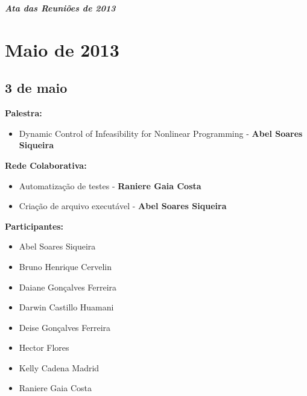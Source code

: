 \documentclass[12pt]{article}
\begin{document}
\centerline{
\textit{\Large\textbf{\emph{{Ata das Reuni\~oes de 2013}}}}}

\vspace{1cm}

\section{Maio de 2013}

\subsection{3 de maio}

{\bf{ Palestra:}}

\begin{itemize}
\item Dynamic Control of Infeasibility for Nonlinear Programming - {\textbf{ Abel Soares Siqueira}}

\end{itemize}
{\bf{Rede Colaborativa:}}

\begin{itemize}
\item Automatiza\c{c}\~ao de testes - {\textbf{ Raniere Gaia Costa}}

\item Cria\c{c}\~ao de arquivo execut\'avel - {\textbf {Abel Soares Siqueira}}

\end{itemize}
{\bf{Participantes:}}

\begin{itemize}
\item Abel Soares Siqueira
\item Bruno Henrique Cervelin
\item Daiane Gon\c{c}alves Ferreira
\item Darwin Castillo Huamani
\item Deise Gon\c{c}alves Ferreira
\item Hector Flores
\item Kelly Cadena Madrid
\item Raniere Gaia Costa
\end{itemize}
\end{document}
